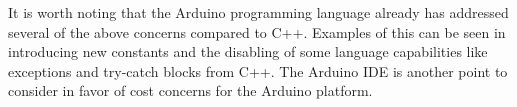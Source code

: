 It is worth noting that the Arduino programming language already has addressed several of the above concerns compared to C++. Examples of this can be seen in introducing new constants and the disabling of some language capabilities like exceptions and try-catch blocks from C++. The Arduino IDE is another point to consider in favor of cost concerns for the Arduino platform.
